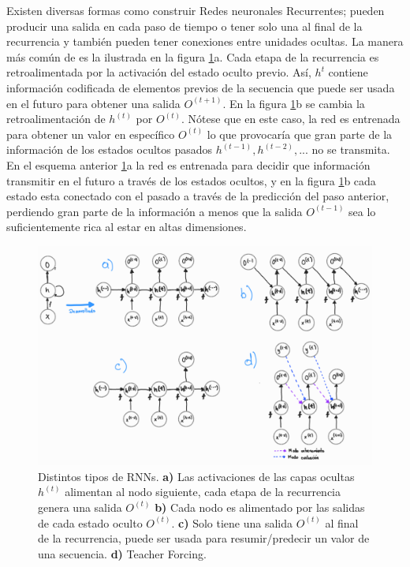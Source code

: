 Existen diversas formas como construir Redes neuronales Recurrentes; pueden producir una
salida en cada paso de tiempo o tener solo una al final de la recurrencia  y también pueden tener
conexiones entre unidades ocultas. La manera más común de es la ilustrada en la figura
\ref{fig:rnn_cfg}a. Cada etapa de la recurrencia es retroalimentada por la activación del estado oculto
previo. Así, $h^{t}$ contiene información codificada de elementos previos de la secuencia que puede
ser usada en el futuro para obtener una salida $O^{(t+1)}$. En la figura \ref{fig:rnn_cfg}b se
cambia la retroalimentación de $h^{(t)}$ por $O^{(t)}$. Nótese que en este caso, la red es entrenada
para obtener un valor en específico $O^{(t)}$ lo que provocaría que gran parte de la información de
los estados ocultos pasados $h^{(t-1)}, h^{(t-2)}, ...$ no se transmita. En el esquema anterior
\ref{fig:rnn_cfg}a la red es entrenada para decidir que información transmitir en el futuro a través
de los estados ocultos, y en la figura \ref{fig:rnn_cfg}b cada estado esta conectado con el pasado
a través de la predicción del paso anterior, perdiendo gran parte de la información a menos que
la salida $O^{(t-1)}$ sea lo suficientemente rica al estar en altas dimensiones.

\begin{figure}[h!]
\centering
\includegraphics[width=.8\textwidth]{Chapters/1. Transformer/Figures/rnn/rnn_cfg.png}
\caption[RNN - CFG]{Distintos tipos de RNNs. \textbf{a)} Las activaciones de las capas ocultas $h^{(t)}$
alimentan al nodo siguiente, cada etapa de la recurrencia genera una salida $O^{(t)}$ \textbf{b)}
Cada nodo es alimentado por las salidas de cada estado oculto $O^{(t)}$. \textbf{c)} Solo tiene una
salida $O^{(t)}$ al final de la recurrencia, puede ser usada para resumir/predecir un valor de una
secuencia. \textbf{d)} Teacher Forcing.}
\label{fig:rnn_cfg}
\end{figure}


